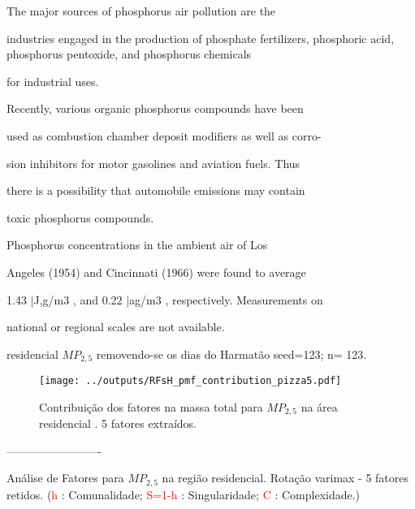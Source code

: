 The major sources of phosphorus air pollution are the

industries engaged in the production of phosphate fertilizers,
phosphoric acid, phosphorus pentoxide, and phosphorus chemicals

for industrial uses.

 Recently, various organic phosphorus compounds have been




used as combustion chamber deposit modifiers as well as corro-




sion inhibitors for motor gasolines and aviation fuels.  Thus




there is a possibility that automobile emissions may contain




toxic phosphorus compounds.

        Phosphorus concentrations in the ambient air of Los



Angeles (1954) and Cincinnati (1966) were found to average



1.43 |J,g/m3 , and 0.22 |ag/m3 , respectively.  Measurements on



national or regional scales are not available.




\begin{table}[H]
  \centering
    
    \caption{residencial $MP_{2,5}$ removendo-se os dias do Harmatão 
              seed=123; n= 123. 
             \label{table:RFsH_profiles5}}
\end{table}

\begin{figure}[H]
\centering
  \texttt{[image: ../outputs/RFsH\_pmf\_contribution\_pizza5.pdf]}
  \caption{Contribuição dos fatores na massa total para $MP_{2,5}$ na área
           residencial . 5 fatores extraídos.
          \label{table:RFsH_contribution5}}
\end{figure}

-------------------------

\begin{table}[H]
  \caption{Análise de Fatores para $MP_{2,5}$ na região residencial.
           Rotação varimax - 5 fatores retidos.
           (\textcolor{red}{h} : Comunalidade; 
           \textcolor{red}{S=1-h} : Singularidade; 
           \textcolor{red}{C} : Complexidade.)}
  
\end{table}


